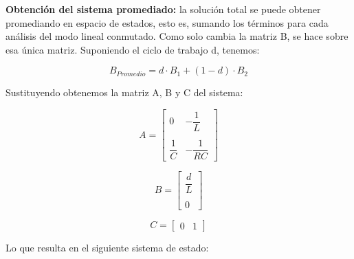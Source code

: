 \textbf{Obtención del sistema promediado:} la solución total se puede obtener promediando en espacio de estados, esto es, sumando los términos 
para cada análisis del modo lineal conmutado. Como solo cambia la matriz B, se hace sobre esa única matriz.
Suponiendo el ciclo de trabajo d, tenemos:

\vspace{-0.5cm}
\begin{equation}
    B_{Promedio} = d \cdot B_1 + (1 - d) \cdot B_2
\end{equation}

Sustituyendo obtenemos la matriz A, B y C del sistema:

\begin{equation}
    A = \begin{bmatrix}
        0 & -\dfrac{1}{L}\\
        \\
        \dfrac{1}{C} & -\dfrac{1}{RC}
    \end{bmatrix}
\end{equation}

\vspace{-0.5cm}
\begin{equation}
    B = \begin{bmatrix}
        \dfrac{d}{L}\\
        \\
        0
    \end{bmatrix}
\end{equation}

\vspace{-0.5cm}
\begin{equation}
    C = \begin{bmatrix}
        0 & 1
    \end{bmatrix}
\end{equation}

Lo que resulta en el siguiente sistema de estado:

